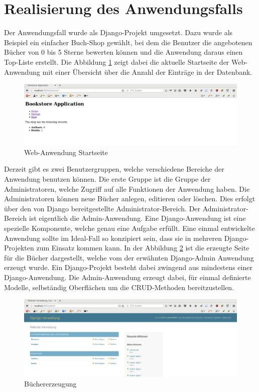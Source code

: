 \section{Realisierung des Anwendungsfalls}
Der Anwendungsfall wurde als Django-Projekt umgesetzt. Dazu wurde als Beispiel
ein einfacher Buch-Shop gewählt, bei dem die Benutzer die angebotenen Bücher von
0 bis 5 Sterne bewerten können und die Anwendung daraus einen Top-Liste erstellt.
Die Abbildung \ref{fig:django-start} zeigt dabei die aktuelle Startseite der
Web-Anwendung mit einer Übersicht über die Anzahl der Einträge in der Datenbank.

\begin{figure}
\centering
\includegraphics[scale=0.25]{images/Web-Application-Entry.png}
\caption{Web-Anwendung Startseite}
\label{fig:django-start}
\end{figure}

Derzeit gibt es zwei Benutzergruppen, welche verschiedene Bereiche der Anwendung
benutzen können. Die erste Gruppe ist die Gruppe der Administratoren, welche
Zugriff auf alle Funktionen der Anwendung haben. Die Administratoren können neue
Bücher anlegen, editieren oder löschen. Dies erfolgt über den von Django
bereitgestellte Administrator-Bereich. Der Administrator-Bereich ist eigentlich
die Admin-Anwendung. Eine Django-Anwendung ist eine spezielle Komponente, welche
genau eine Aufgabe erfüllt. Eine einmal entwickelte Anwendung sollte im
Ideal-Fall so konzipiert sein, dass sie in mehreren Django-Projekten zum Einsatz
kommen kann. In der Abbildung \ref{fig:django-create} ist die erzeugte Seite
für die Bücher dargestellt, welche vom der erwähnten Django-Admin Anwendung
erzeugt wurde.
Ein Django-Projekt besteht dabei zwingend aus mindestens einer
Django-Anwendung. Die Admin-Anwendung erzeugt dabei, für einmal definierte
Modelle, selbständig Oberflächen um die CRUD-Methoden bereitzustellen.

\begin{figure}
\centering
\includegraphics[scale=0.25]{images/Creation.png}
\caption{Büchererzeugung}
\label{fig:django-create}
\end{figure}

